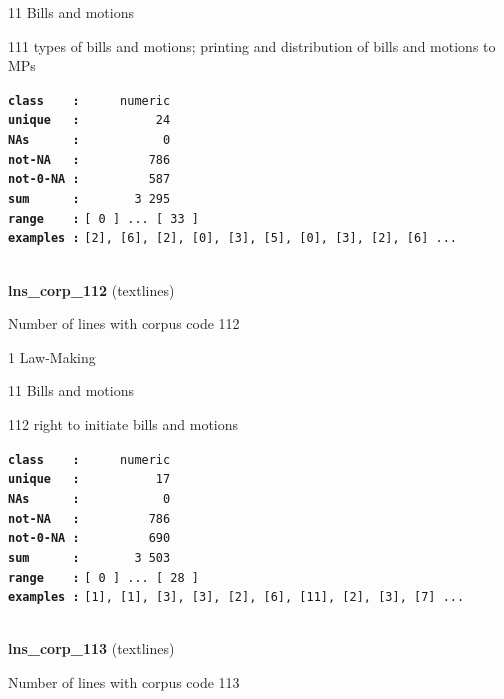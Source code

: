 \documentclass[]{article}
\begin{document}
11 Bills and motions

111 types of bills and motions; printing and distribution of bills and
motions to MPs

\textbf{\texttt{class\ \ \ \ :}} \texttt{~~~~~numeric}\\
\textbf{\texttt{unique\ \ \ :}} \texttt{~~~~~~~~~~24}\\
\textbf{\texttt{NAs\ \ \ \ \ \ :}} \texttt{~~~~~~~~~~~0}\\
\textbf{\texttt{not-NA\ \ \ :}} \texttt{~~~~~~~~~786}\\
\textbf{\texttt{not-0-NA\ :}} \texttt{~~~~~~~~~587}\\
\textbf{\texttt{sum\ \ \ \ \ \ :}} \texttt{~~~~~~~3~295}\\
\textbf{\texttt{range\ \ \ \ :}}
\texttt{{[}\ 0\ {]}\ ...\ {[}\ 33\ {]}}\\
\textbf{\texttt{examples\ :}}
\texttt{{[}2{]},\ {[}6{]},\ {[}2{]},\ {[}0{]},\ {[}3{]},\ {[}5{]},\ {[}0{]},\ {[}3{]},\ {[}2{]},\ {[}6{]}\ ...}\\

~

\textbf{lns\_corp\_112} (textlines)

Number of lines with corpus code 112

1 Law-Making

11 Bills and motions

112 right to initiate bills and motions

\textbf{\texttt{class\ \ \ \ :}} \texttt{~~~~~numeric}\\
\textbf{\texttt{unique\ \ \ :}} \texttt{~~~~~~~~~~17}\\
\textbf{\texttt{NAs\ \ \ \ \ \ :}} \texttt{~~~~~~~~~~~0}\\
\textbf{\texttt{not-NA\ \ \ :}} \texttt{~~~~~~~~~786}\\
\textbf{\texttt{not-0-NA\ :}} \texttt{~~~~~~~~~690}\\
\textbf{\texttt{sum\ \ \ \ \ \ :}} \texttt{~~~~~~~3~503}\\
\textbf{\texttt{range\ \ \ \ :}}
\texttt{{[}\ 0\ {]}\ ...\ {[}\ 28\ {]}}\\
\textbf{\texttt{examples\ :}}
\texttt{{[}1{]},\ {[}1{]},\ {[}3{]},\ {[}3{]},\ {[}2{]},\ {[}6{]},\ {[}11{]},\ {[}2{]},\ {[}3{]},\ {[}7{]}\ ...}\\

~

\textbf{lns\_corp\_113} (textlines)

Number of lines with corpus code 113
\end{document}
